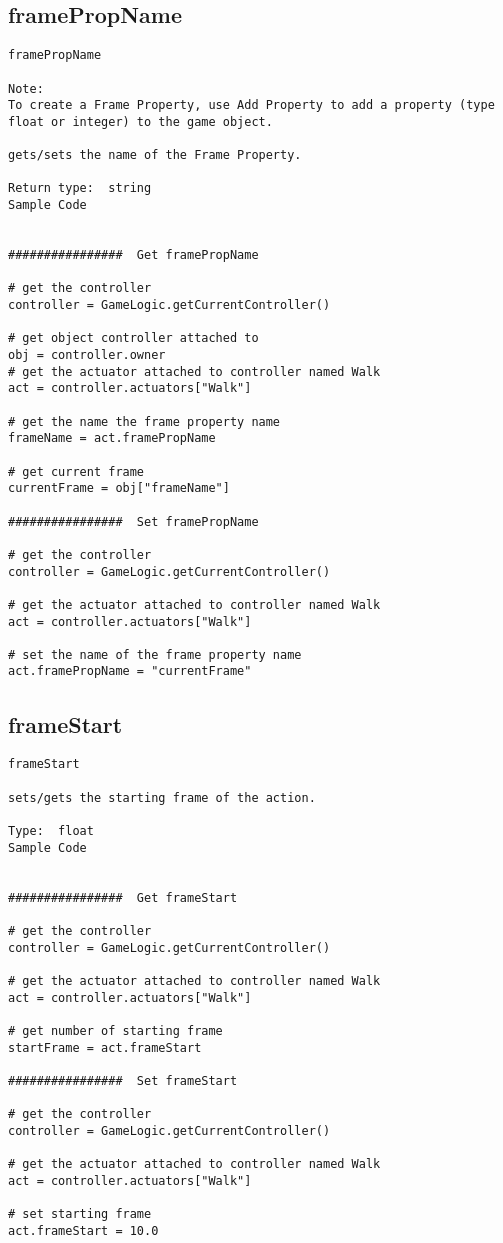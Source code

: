 \subsection{framePropName}
\begin{verbatim}
framePropName

Note:
To create a Frame Property, use Add Property to add a property (type float or integer) to the game object.  

gets/sets the name of the Frame Property.

Return type:  string
Sample Code


################  Get framePropName

# get the controller
controller = GameLogic.getCurrentController()

# get object controller attached to
obj = controller.owner
# get the actuator attached to controller named Walk
act = controller.actuators["Walk"]

# get the name the frame property name
frameName = act.framePropName

# get current frame
currentFrame = obj["frameName"] 

################  Set framePropName

# get the controller
controller = GameLogic.getCurrentController()

# get the actuator attached to controller named Walk
act = controller.actuators["Walk"]

# set the name of the frame property name
act.framePropName = "currentFrame"
\end{verbatim}

\subsection{frameStart}
\begin{verbatim}
frameStart

sets/gets the starting frame of the action.

Type:  float
Sample Code


################  Get frameStart

# get the controller
controller = GameLogic.getCurrentController()

# get the actuator attached to controller named Walk
act = controller.actuators["Walk"]

# get number of starting frame
startFrame = act.frameStart

################  Set frameStart

# get the controller
controller = GameLogic.getCurrentController()

# get the actuator attached to controller named Walk
act = controller.actuators["Walk"]

# set starting frame
act.frameStart = 10.0
\end{verbatim}


